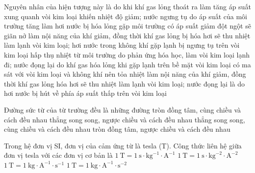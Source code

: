 \begin{ex}
\begin{center}
		\end{center}
		Nguyên nhân của hiện tượng này là do khi khí gas lỏng thoát ra
		\choice
		{làm tăng áp suất xung quanh vòi kim loại khiến nhiệt độ giảm; nước ngưng tụ do áp suất của môi trường tăng làm hơi nước bị hóa lỏng}
		{\True gặp môi trường có áp suất giảm đột ngột sẽ giãn nở làm nội năng của khí giảm, đồng thời khí gas lỏng bị hóa hơi sẽ thu nhiệt làm lạnh vòi kim loại; hơi nước trong không khí gặp lạnh bị ngưng tụ trên vòi kim loại}
		{hấp thụ nhiệt từ môi trường do phản ứng hóa học, làm vòi kim loại lạnh đi; nước đọng lại do khí gas hóa lỏng khi gặp lạnh trên bề mặt vòi kim loại}
		{có ma sát với vòi kim loại và không khí nên tỏa nhiệt làm nội năng của khí giảm, đồng thời khí gas lỏng hóa hơi sẽ thu nhiệt làm lạnh vòi kim loại; nước đọng lại là do hơi nước bị hút về phía áp suất thấp trên vòi kim loại}
	\end{ex}

	\begin{ex}%
		Đường sức từ của từ trường đều là những đường
		\choice
		{tròn đồng tâm, cùng chiều và cách đều nhau}
		{thẳng song song, ngược chiều và cách đều nhau}
		{\True thẳng song song, cùng chiều và cách đều nhau}
		{tròn đồng tâm, ngược chiều và cách đều nhau}
	\end{ex}

	\begin{ex}%
		Trong hệ đơn vị SI, đơn vị của cảm ứng từ là tesla (T). Công thức liên hệ giữa đơn vị tesla với các đơn vị cơ bản là
		\choice
		{$1~\text{T}=1~\text{s}\cdot\text{kg}^{-1}\cdot\text{A}^{-1}$}
		{$1~\text{T}=1~\text{s}\cdot\text{kg}^{-2}\cdot\text{A}^{-2}$}
		{$1~\text{T}=1~\text{kg}\cdot\text{A}^{-1}\cdot\text{s}^{-1}$}
		{\True $1~\text{T}=1~\text{kg}\cdot\text{A}^{-1}\cdot\text{s}^{-2}$}
	\end{ex}

